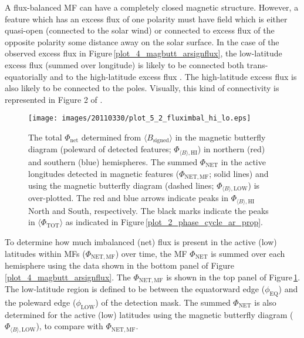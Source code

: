 \documentclass[namedreferences]{solarphysics}
\makeatletter
\def\ScaleIfNeeded{%
\ifdim\Gin@nat@width>\linewidth
\linewidth
\else
\Gin@nat@width
\fi
}
\makeatother
\begin{document}
\begin{article}
A flux-balanced MF can have a completely closed magnetic structure. However, a feature which has an excess flux of one polarity must have field which is either quasi-open (connected to the solar wind) or connected to excess flux of the opposite polarity some distance away on the solar surface. In the case of the observed excess flux in Figure\,\ref{plot_4_magbutt_arsignflux}, the low-latitude excess flux (summed over longitude) is likely to be connected both trans-equatorially and to the high-latitude excess flux \citep{Choudhary:2002}. The high-latitude excess flux is also likely to be connected to the poles. Visually, this kind of connectivity is represented in Figure 2 of \citet{Bravo:1998}.


\begin{figure}[!ht]
\begin{center}
\texttt{[image: images/20110330/plot\_5\_2\_fluximbal\_hi\_lo.eps]}
\end{center}
\caption{The total $\Phi_{\mathrm{net}}$ determined from $\langle B_{\mathrm{signed}}\rangle$ in the magnetic butterfly diagram (poleward of detected features; $\Phi_{\langle B \rangle,\mathrm{HI}}$) in northern (red) and southern (blue) hemispheres. The summed $\Phi_{\mathrm{NET}}$ in the active longitudes detected in magnetic features ($\Phi_{\mathrm{NET,MF}}$; solid lines) and using the magnetic butterfly diagram (dashed lines; $\Phi_{\langle B \rangle,\mathrm{LOW}}$) is over-plotted. The red and blue arrows indicate peaks in $\Phi_{\langle B \rangle,\mathrm{HI}}$ North and South, respectively. The black marks indicate the peaks in $\langle\Phi_\mathrm{TOT}\rangle$ as indicated in Figure\,\ref{plot_2_phase_cycle_ar_prop}.}
\label{plot_5_fluximbal_hi_lo}
\end{figure}

To determine how much imbalanced (net) flux is present in the active (low) latitudes within MFs ($\Phi_{\mathrm{NET,MF}}$) over time, the MF $\Phi_{\mathrm{NET}}$ is summed over each hemisphere using the data shown in the bottom panel of Figure\,\ref{plot_4_magbutt_arsignflux}. The $\Phi_{\mathrm{NET,MF}}$ is shown in the top panel of Figure\,\ref{plot_5_fluximbal_hi_lo}. The low-latitude region is defined to be between the equatorward edge ($\phi_\mathrm{EQ}$) and the poleward edge ($\phi_\mathrm{LOW}$) of the detection mask. The summed $\Phi_{\mathrm{NET}}$ is also determined for the active (low) latitudes using the magnetic butterfly diagram ($\Phi_{\langle B \rangle,\mathrm{LOW}}$), to compare with $\Phi_{\mathrm{NET,MF}}$. 


\end{article}
\end{document}

